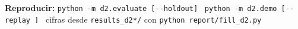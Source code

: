 \documentclass[10pt,a4paper]{extarticle}
\begin{document}
\vfill
\begin{tcolorbox}[colback=paper,colframe=navy,boxrule=0.8pt,left=2mm,right=2mm,top=0.9mm,bottom=0.9mm,arc=1mm,
  before skip=0pt,after skip=0pt]
\scriptsize \textbf{Reproducir:} \texttt{python -m d2.evaluate [-{}-holdout]} \textbullet\ \texttt{python -m d2.demo [-{}-replay \fcIdOrQ]} \textbullet\ cifras desde \texttt{results\_d2*/} con \texttt{python report/fill\_d2.py}
\end{tcolorbox}
\end{document}
